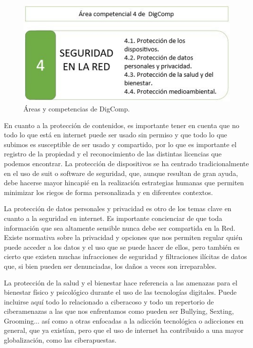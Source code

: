 \documentclass[spanish]{textolivre}
\begin{document}
\begin{figure}[h!]
\centering
\begin{minipage}{0.5\textwidth}
\includegraphics[width=\textwidth]{Fig2.png}
\caption{Áreas y competencias de DigComp.}
\label{fig2}
\end{minipage}
\end{figure}

En cuanto a la protección de contenidos, es importante tener en cuenta que no todo lo que está en internet puede ser usado sin permiso y que todo lo que subimos es susceptible de ser usado y compartido, por lo que es importante el registro de la propiedad y el reconocimiento de las distintas licencias que podemos encontrar. La protección de dispositivos se ha centrado tradicionalmente en el uso de suit o software de seguridad, que, aunque resultan de gran ayuda, debe hacerse mayor hincapié en la realización estrategias humanas que permiten minimizar los riegos de forma personalizada y en diferentes contextos.

La protección de datos personales y privacidad es otro de los temas clave en cuanto a la seguridad en internet. Es importante concienciar de que toda información que sea altamente sensible nunca debe ser compartida en la Red. Existe normativa sobre la privacidad y opciones que nos permiten regular quién puede acceder a los datos y el uso que se puede hacer de ellos, pero también es cierto que existen muchas infracciones de seguridad y filtraciones ilícitas de datos que, si bien pueden ser denunciadas, los daños a veces son irreparables.

La protección de la salud y el bienestar hace referencia a las amenazas para el bienestar físico y psicológico durante el uso de las tecnologías digitales. Puede incluirse aquí todo lo relacionado a ciberacoso y todo un repertorio de ciberamenazas a las que nos enfrentamos como pueden ser Bullying, Sexting, Grooming... \cite{reset2022problemas} así como a otras enfocadas a la adicción tecnológica o adicciones en general, que ya existían, pero que el uso de internet ha contribuido a una mayor globalización, como las ciberapuestas.
\end{document}
